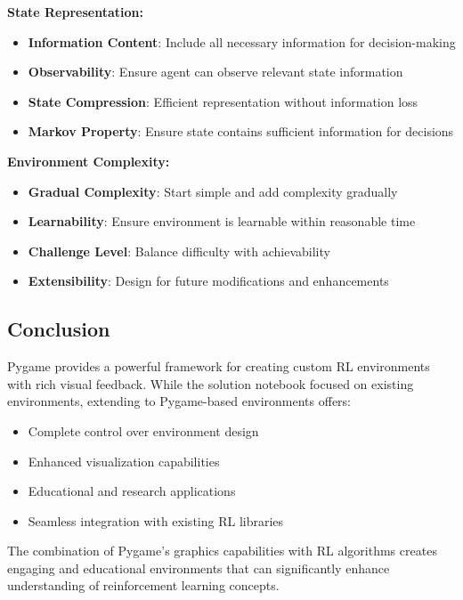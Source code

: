 \documentclass[12pt]{article}
\begin{document}
{{{\textbf{State Representation:}
\begin{itemize}
    \item \textbf{Information Content}: Include all necessary information for decision-making
    \item \textbf{Observability}: Ensure agent can observe relevant state information
    \item \textbf{State Compression}: Efficient representation without information loss
    \item \textbf{Markov Property}: Ensure state contains sufficient information for decisions
\end{itemize}

\textbf{Environment Complexity:}
\begin{itemize}
    \item \textbf{Gradual Complexity}: Start simple and add complexity gradually
    \item \textbf{Learnability}: Ensure environment is learnable within reasonable time
    \item \textbf{Challenge Level}: Balance difficulty with achievability
    \item \textbf{Extensibility}: Design for future modifications and enhancements
\end{itemize}

\subsection{Conclusion}

Pygame provides a powerful framework for creating custom RL environments with rich visual feedback. While the solution notebook focused on existing environments, extending to Pygame-based environments offers:

\begin{itemize}
    \item Complete control over environment design
    \item Enhanced visualization capabilities
    \item Educational and research applications
    \item Seamless integration with existing RL libraries
\end{itemize}

The combination of Pygame's graphics capabilities with RL algorithms creates engaging and educational environments that can significantly enhance understanding of reinforcement learning concepts.

}}}
\end{document}
